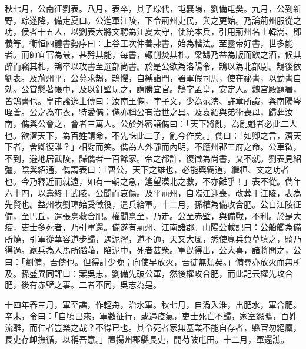 \begin{pinyinscope}
秋七月，公南征劉表。八月，表卒，其子琮代，屯襄陽，劉備屯樊。九月，公到新野，琮遂降，備走夏口。公進軍江陵，下令荊州吏民，與之更始。乃論荊州服從之功，侯者十五人，以劉表大將文聘為江夏太守，使統本兵，引用荊州名士韓嵩、鄧義等。衞恒四體書勢序曰：上谷王次仲善隷書，始為楷法。至靈帝好書，世多能者。而師宜官為最，甚矜其能，每書，輙削焚其札。梁鵠乃益為版而飲之酒，候其醉而竊其札，鵠卒以攻書至選部尚書。於是公欲為洛陽令，鵠以為北部尉。鵠後依劉表。及荊州平，公募求鵠，鵠懼，自縛詣門，署軍假司馬，使在祕書，以勤書自効。公甞懸著帳中，及以釘壁玩之，謂勝宜官。鵠字孟皇，安定人。魏宮殿題署，皆鵠書也。皇甫謐逸士傳曰：汝南王儁，字子文，少為范滂、許章所識，與南陽岑晊善。公之為布衣，特愛儁；儁亦稱公有治世之具。及袁紹與弟術喪母，歸葬汝南，儁與公會之，會者三萬人。公於外密語儁曰：「天下將亂，為亂魁者必此二人也。欲濟天下，為百姓請命，不先誅此二子，亂今作矣。」儁曰：「如卿之言，濟天下者，舍卿復誰？」相對而笑。儁為人外靜而內明，不應州郡三府之命。公車徵，不到，避地居武陵，歸儁者一百餘家。帝之都許，復徵為尚書，又不就。劉表見紹彊，陰與紹通，儁謂表曰：「曹公，天下之雄也，必能興霸道，繼桓、文之功者也。今乃釋近而就遠，如有一朝之急，遙望漠北之救，不亦難乎！」表不從。儁年六十四，以壽終于武陵，公聞而哀傷。及平荊州，自臨江迎喪，改葬于江陵，表為先賢也。益州牧劉璋始受徵役，遣兵給軍。十二月，孫權為備攻合肥。公自江陵征備，至巴丘，遣張憙救合肥。權聞憙至，乃走。公至赤壁，與備戰，不利。於是大疫，吏士多死者，乃引軍還。備遂有荊州、江南諸郡。山陽公載記曰：公船艦為備所燒，引軍從華容道步歸，遇泥濘，道不通，天又大風，悉使羸兵負草填之，騎乃得過。羸兵為人馬所蹈藉，陷泥中，死者甚衆。軍旣得出，公大喜，諸將問之，公曰：「劉備，吾儔也。但得計少晚；向使早放火，吾徒無類矣。」備尋亦放火而無所及。孫盛異同評曰：案吳志，劉備先破公軍，然後權攻合肥，而此記云權先攻合肥，後有赤壁之事。二者不同，吳志為是。

十四年春三月，軍至譙，作輕舟，治水軍。秋七月，自渦入淮，出肥水，軍合肥。辛未，令曰：「自頃已來，軍數征行，或遇疫氣，吏士死亡不歸，家室怨曠，百姓流離，而仁者豈樂之哉？不得已也。其令死者家無基業不能自存者，縣官勿絕廩，長吏存卹撫循，以稱吾意。」置揚州郡縣長吏，開芍陂屯田。十二月，軍還譙。


\end{pinyinscope}
